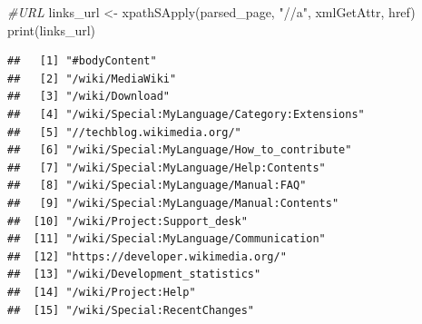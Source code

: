 \documentclass[
]{article}
\newenvironment{Shaded}{\begin{snugshade}}{\end{snugshade}}
\newcommand{\CommentTok}[1]{\textcolor[rgb]{0.56,0.35,0.01}{\textit{#1}}}
\newcommand{\FunctionTok}[1]{\textcolor[rgb]{0.00,0.00,0.00}{#1}}
\newcommand{\NormalTok}[1]{#1}
\newcommand{\OtherTok}[1]{\textcolor[rgb]{0.56,0.35,0.01}{#1}}
\newcommand{\StringTok}[1]{\textcolor[rgb]{0.31,0.60,0.02}{#1}}
\begin{document}
\begin{Shaded}
\begin{Highlighting}[]
\CommentTok{\#URL}
\NormalTok{links\_url }\OtherTok{\textless{}{-}} \FunctionTok{xpathSApply}\NormalTok{(parsed\_page, }\StringTok{"//a"}\NormalTok{, xmlGetAttr, }\StringTok{\textquotesingle{}href\textquotesingle{}}\NormalTok{)}
\FunctionTok{print}\NormalTok{(links\_url)}
\end{Highlighting}
\end{Shaded}

\begin{verbatim}
##   [1] "#bodyContent"                                                                                                                
##   [2] "/wiki/MediaWiki"                                                                                                             
##   [3] "/wiki/Download"                                                                                                              
##   [4] "/wiki/Special:MyLanguage/Category:Extensions"                                                                                
##   [5] "//techblog.wikimedia.org/"                                                                                                   
##   [6] "/wiki/Special:MyLanguage/How_to_contribute"                                                                                  
##   [7] "/wiki/Special:MyLanguage/Help:Contents"                                                                                      
##   [8] "/wiki/Special:MyLanguage/Manual:FAQ"                                                                                         
##   [9] "/wiki/Special:MyLanguage/Manual:Contents"                                                                                    
##  [10] "/wiki/Project:Support_desk"                                                                                                  
##  [11] "/wiki/Special:MyLanguage/Communication"                                                                                      
##  [12] "https://developer.wikimedia.org/"                                                                                            
##  [13] "/wiki/Development_statistics"                                                                                                
##  [14] "/wiki/Project:Help"                                                                                                          
##  [15] "/wiki/Special:RecentChanges"                                                                                                 

\end{verbatim}
\end{document}
